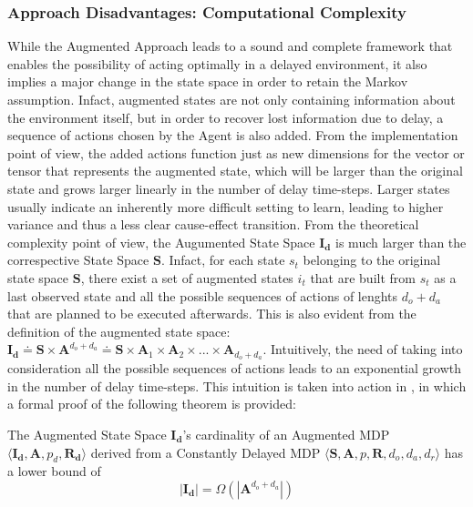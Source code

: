             \subsubsection{Approach Disadvantages: Computational Complexity}
                While the Augmented Approach leads to a sound and complete framework that enables the possibility of acting optimally in a delayed environment, it also implies a major change in the state space in order to retain the Markov assumption. Infact, augmented states are not only containing information about the environment itself, but in order to recover lost information due to delay, a sequence of actions chosen by the Agent is also added. \newline
                From the implementation point of view, the added actions function just as new dimensions for the vector or tensor that represents the augmented state, which will be larger than the original state and grows larger linearly in the number of delay time-steps. Larger states usually indicate an inherently more difficult setting to learn, leading to higher variance and thus a less clear cause-effect transition. From the theoretical complexity point of view, the Augumented State Space $\mathbf{I_d}$ is much larger than the correspective State Space $\mathbf{S}$. Infact, for each state $s_t$ belonging to the original state space $\mathbf{S}$, there exist a set of augmented states $i_t$ that are built from $s_t$ as a last observed state and all the possible sequences of actions of lenghts $d_o+d_a$ that are planned to be executed afterwards. This is also evident from the definition of the augmented state space: $\mathbf{I_d} \doteq \mathbf{S} \times \mathbf{A}^{d_o+d_a} \doteq \mathbf{S} \times \mathbf{A}_{1} \times \mathbf{A}_{2} \times ... \times \mathbf{A}_{d_o+d_a}$. Intuitively, the need of taking into consideration all the possible sequences of actions leads to an exponential growth in the number of delay time-steps. This intuition is taken into action in , in which a formal proof of the following theorem is provided:
                
                \begin{theorem}
                    \label{th:dmdpobscomplexity}
                    The Augmented State Space $\mathbf{I_d}$'s cardinality of an Augmented MDP $\langle \mathbf{I_d}, \mathbf{A}, p_d, \mathbf{R_d} \rangle$ derived from a Constantly Delayed MDP $\langle \mathbf{S}, \mathbf{A}, p, \mathbf{R}, d_o, d_a, d_r \rangle$ has a lower bound of \[ | \mathbf{I_d} | = \Omega \left( | \mathbf{A}^{d_o + d_a} | \right) \]
                \end{theorem}
                
